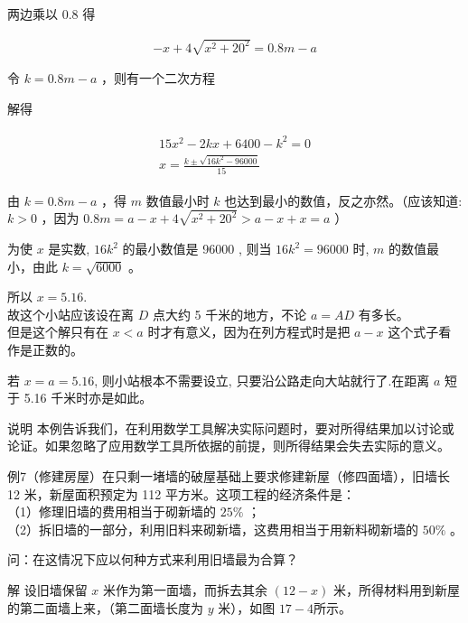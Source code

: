 \documentclass[10pt]{article}
\begin{document}
两边乘以 0.8 得

\begin{align*}
-x+4 \sqrt{x^{2}+20^{2}}=0.8 m-a
\end{align*}

令 $k=0.8 m-a$ ，则有一个二次方程

解得

\begin{align*}
\begin{gathered}
15 x^{2}-2 k x+6400-k^{2}=0 \\
x=\frac{k \pm \sqrt{16 k^{2}-96000}}{15}
\end{gathered}
\end{align*}

由 $k=0.8 m-a$ ，得 $m$ 数值最小时 $k$ 也达到最小的数值，反之亦然。（应该知道: $k>0$ ，因为 $0.8 m=a-x+4 \sqrt{x^{2}+20^{2}}>a-x+x=a$ ）

为使 $x$ 是实数, $16 k^{2}$ 的最小数值是 96000 , 则当 $16 k^{2}=96000$ 时, $m$ 的数值最小，由此 $k=\sqrt{6000}$ 。

所以 $x=5.16$.\\
故这个小站应该设在离 $D$ 点大约 5 千米的地方，不论 $a=A D$ 有多长。\\
但是这个解只有在 $x<a$ 时才有意义，因为在列方程式时是把 $a-x$ 这个式子看作是正数的。

若 $x=a=5.16$, 则小站根本不需要设立, 只要沿公路走向大站就行了.在距离 $a$ 短于 5.16 千米时亦是如此。

说明 本例告诉我们，在利用数学工具解决实际问题时，要对所得结果加以讨论或论证。如果忽略了应用数学工具所依据的前提，则所得结果会失去实际的意义。

例7（修建房屋）在只剩一堵墙的破屋基础上要求修建新屋（修四面墙），旧墙长 12 米，新屋面积预定为 112 平方米。这项工程的经济条件是：\\
（1）修理旧墙的费用相当于砌新墙的 $25 \%$ ；\\
（2）拆旧墙的一部分，利用旧料来砌新墙，这费用相当于用新料砌新墙的 $50 \%$ 。

问：在这情况下应以何种方式来利用旧墙最为合算？

解 设旧墙保留 $x$ 米作为第一面墙，而拆去其余 $(12-x)$ 米，所得材料用到新屋的第二面墙上来，（第二面墙长度为 $y$ 米），如图 $17-4$所示。
\end{document}
